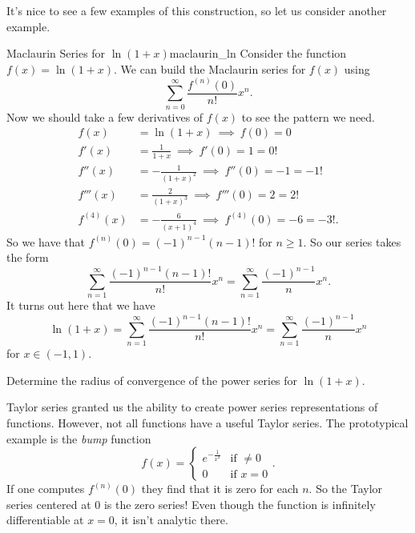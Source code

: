 It's nice to see a few examples of this construction, so let us consider another example.

\begin{ex}{Maclaurin Series for $\ln(1+x)$}{maclaurin_ln}
Consider the function $f(x)=\ln(1+x)$.  We can build the Maclaurin series for $f(x)$ using
\[
\sum_{n=0}^\infty \frac{f^{(n)}(0)}{n!}x^n.
\]
Now we should take a few derivatives of $f(x)$ to see the pattern we need.
\begin{align*}
    f(x)&= \ln(1+x) ~\implies~ f(0)=0\\
    f'(x)&=\frac{1}{1+x} ~\implies~ f'(0)=1=0!\\
    f''(x)&= -\frac{1}{(1+x)^2} ~\implies~ f''(0)=-1=-1!\\
    f'''(x)&= \frac{2}{(1+x)^3} ~\implies~ f'''(0)=2=2!\\
    f^{(4)}(x)&= -\frac{6}{(x+1)^4} ~\implies~ f^{(4)}(0)=-6=-3!.
\end{align*}
So we have that $f^{(n)}(0)=(-1)^{n-1}(n-1)!$ for $n\geq 1$. So our series takes the form
\[
\sum_{n=1}^\infty \frac{(-1)^{n-1}(n-1)!}{n!}x^n = \sum_{n=1}^\infty \frac{(-1)^{n-1}}{n}x^n.
\]
It turns out here that we have
\[
\ln(1+x)=\sum_{n=1}^\infty \frac{(-1)^{n-1}(n-1)!}{n!}x^n = \sum_{n=1}^\infty \frac{(-1)^{n-1}}{n}x^n
\]
for $x\in (-1,1)$.
\end{ex}

\begin{exercise}
Determine the radius of convergence of the power series for $\ln(1+x)$.
\end{exercise}

Taylor series granted us the ability to create power series representations of functions.  However, not all functions have a useful Taylor series.  The prototypical example is the \emph{bump} function
\[
f(x) = \begin{cases} e^{-\frac{1}{x^2}} & \textrm{if $\neq 0$}\\ 0 & \textrm{if $x=0$} \end{cases}.
\]
If one computes $f^{(n)}(0)$ they find that it is zero for each $n$. So the Taylor series centered at $0$ is the zero series! Even though the function is infinitely differentiable at $x=0$, it isn't analytic there.

